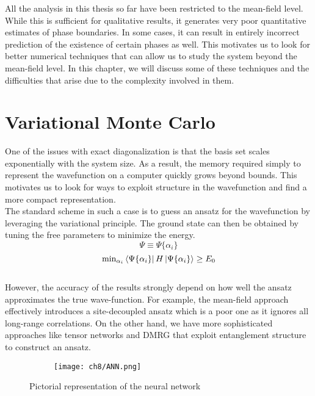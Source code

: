 All the analysis in this thesis so far have been restricted to the mean-field level. While this is sufficient for qualitative results, it generates very poor quantitative estimates of phase boundaries. In some cases, it can result in entirely incorrect prediction of the existence of certain phases as well. This motivates us to look for better numerical techniques that can allow us to study the system beyond the mean-field level. In this chapter, we will discuss some of these techniques and the difficulties that arise due to the complexity involved in them.

\section{Variational Monte Carlo}
One of the issues with exact diagonalization is that the basis set scales exponentially with the system size. As a result, the memory required simply to represent the wavefunction on a computer quickly grows beyond bounds. This motivates us to look for ways to exploit structure in the wavefunction and find a more compact representation. 
\vspace{0.5cm}\\
The standard scheme in such a case is to guess an ansatz for the wavefunction by leveraging the variational principle. The ground state can then be obtained by tuning the free parameters to minimize the energy.
$$\Psi \equiv \Psi\{\alpha_i\}$$
$$\text{min}_{\alpha_i} \bra{\Psi\{\alpha_i\}}H\ket{\Psi\{\alpha_i\}} \geq E_0$$
\vspace{0.1cm}\\
However, the accuracy of the results strongly depend on how well the ansatz approximates the true wave-function. For example, the mean-field approach effectively introduces a site-decoupled ansatz which is a poor one as it ignores all long-range correlations. On the other hand, we have more sophisticated approaches like tensor networks and DMRG\cite{Ors2014, Ors2019} that exploit entanglement structure to construct an ansatz.

\begin{figure}[!htb]
    \centering
    \begin{subfigure}[b]{0.75\textwidth}  %
        \centering
        \texttt{[image: ch8/ANN.png]}
    \end{subfigure}
    \caption{Pictorial representation of the neural network}
    \label{fig:ann}
\end{figure}
\FloatBarrier \!\!\!\!\!\!\!\!\!\!\!

